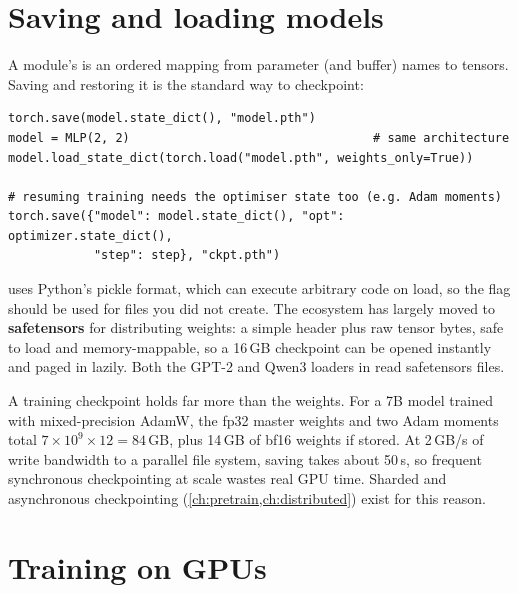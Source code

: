 \section{Saving and loading models}\label{sec:pytorch:save}

A module's  is an ordered mapping from parameter (and buffer) names to tensors. Saving and
restoring it is the standard way to checkpoint:

\begin{lstlisting}[caption={Saving and restoring weights (and, for resuming, optimiser state).},label={lst:pytorch:save}]
torch.save(model.state_dict(), "model.pth")
model = MLP(2, 2)                                  # same architecture
model.load_state_dict(torch.load("model.pth", weights_only=True))

# resuming training needs the optimiser state too (e.g. Adam moments)
torch.save({"model": model.state_dict(), "opt": optimizer.state_dict(),
            "step": step}, "ckpt.pth")
\end{lstlisting}

 uses Python's pickle format, which can execute arbitrary code on load, so the flag
 should be used for files you did not create. The ecosystem has largely moved to
\textbf{safetensors} for distributing weights: a simple header plus raw tensor bytes, safe to load and
memory-mappable, so a 16\,GB checkpoint can be opened instantly and paged in lazily. Both the GPT-2 and Qwen3
loaders in  read safetensors files.

\begin{napkinmath}
A training checkpoint holds far more than the weights. For a 7B model trained with mixed-precision AdamW, the
fp32 master weights and two Adam moments total $7\times10^9\times12=84$\,GB, plus 14\,GB of bf16 weights if stored.
At 2\,GB/s of write bandwidth to a parallel file system, saving takes about 50\,s, so frequent synchronous
checkpointing at scale wastes real GPU time. Sharded and asynchronous checkpointing (\cref{ch:pretrain,ch:distributed})
exist for this reason.
\end{napkinmath}

\section{Training on GPUs}\label{sec:pytorch:gpu}

